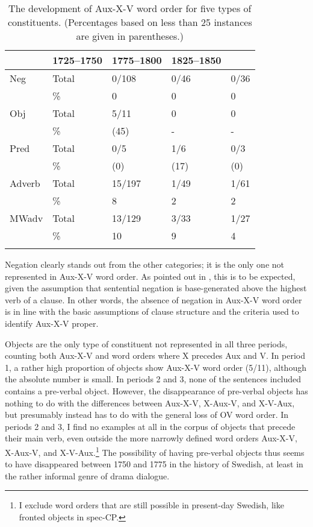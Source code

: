 \documentclass[output=paper, colorlinks, citecolor=brown]{langscibook}
\begin{document}
\begin{table}
\caption{The development of Aux-X-V word order for five types of constituents. (Percentages based on less than 25 instances are given in parentheses.)\label{tab:sangfelt:2}}

\begin{tabularx}{\textwidth}{XXXXX}
\lsptoprule
\multicolumn{2}{c}{Constituent type} & 1725–1750 & 1775–1800 & 1825–1850\\
\midrule
Neg & Total & 0/108 & 0/46 & 0/36\\
& \% & 0 & 0 & 0\\
Obj & Total & 5/11 & 0 & 0\\
& \% & (45) & {}- & {}-\\
Pred & Total & 0/5 & 1/6 & 0/3\\
& \% & (0) & (17) & (0)\\
Adverb & Total & 15/197 & 1/49 & 1/61\\
& \% & 8 & 2 & 2\\
MWadv & Total & 13/129 & 3/33 & 1/27\\
& \% & 10 & 9 & 4\\
\lspbottomrule
\end{tabularx}
\end{table}
 
 
Negation clearly stands out from the other categories; it is the only one not represented in Aux-X-V word order. As pointed out in , this is to be expected, given the assumption that sentential negation is base-generated above the highest verb of a clause. In other words, the absence of negation in Aux-X-V word order is in line with the basic assumptions of clause structure and the criteria used to identify Aux-X-V proper.


Objects are the only type of constituent not represented in all three periods, counting both Aux-X-V and word orders where X precedes Aux and V. In period 1, a rather high proportion of objects show Aux-X-V word order (5/11), although the absolute number is small. In periods 2 and 3, none of the sentences included contains a pre-verbal object. However, the disappearance of pre-verbal objects has nothing to do with the differences between Aux-X-V, X-Aux-V, and X-V-Aux, but presumably instead has to do with the general loss of OV word order. In periods 2 and 3, I find no examples at all in the corpus of objects that precede their main verb, even outside the more narrowly defined word orders Aux-X-V, X-Aux-V, and X-V-Aux.\footnote{I exclude word orders that are still possible in present-day Swedish, like fronted objects in spec-CP.} The possibility of having pre-verbal objects thus seems to have disappeared between 1750 and 1775 in the history of Swedish, at least in the rather informal genre of drama dialogue.
\end{document}
